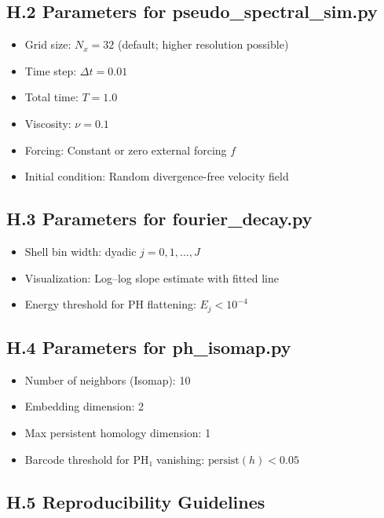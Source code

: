 \documentclass[11pt]{article}
\theoremstyle{definition}
\begin{document}
\subsection*{H.2 Parameters for pseudo\_spectral\_sim.py}

\begin{itemize}
  \item Grid size: \( N_x = 32 \) (default; higher resolution possible)
  \item Time step: \( \Delta t = 0.01 \)
  \item Total time: \( T = 1.0 \)
  \item Viscosity: \( \nu = 0.1 \)
  \item Forcing: Constant or zero external forcing \( f \)
  \item Initial condition: Random divergence-free velocity field
\end{itemize}

\subsection*{H.3 Parameters for fourier\_decay.py}

\begin{itemize}
  \item Shell bin width: dyadic \( j = 0,1,...,J \)
  \item Visualization: Log–log slope estimate with fitted line
  \item Energy threshold for PH flattening: \( E_j < 10^{-4} \)
\end{itemize}

\subsection*{H.4 Parameters for ph\_isomap.py}

\begin{itemize}
  \item Number of neighbors (Isomap): 10
  \item Embedding dimension: 2
  \item Max persistent homology dimension: 1
  \item Barcode threshold for PH₁ vanishing: \( \mathrm{persist}(h) < 0.05 \)
\end{itemize}

\subsection*{H.5 Reproducibility Guidelines}
\end{document}
